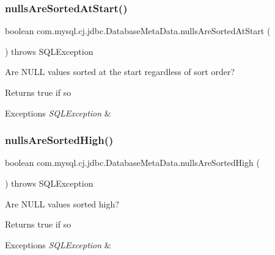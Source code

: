 \subsubsection{\texorpdfstring{nulls\+Are\+Sorted\+At\+Start()}{nullsAreSortedAtStart()}}
{\footnotesize\ttfamily boolean com.\+mysql.\+cj.\+jdbc.\+Database\+Meta\+Data.\+nulls\+Are\+Sorted\+At\+Start (\begin{DoxyParamCaption}{ }\end{DoxyParamCaption}) throws S\+Q\+L\+Exception}

Are N\+U\+LL values sorted at the start regardless of sort order?

\begin{DoxyReturn}{Returns}
true if so 
\end{DoxyReturn}

\begin{DoxyExceptions}{Exceptions}
{\em S\+Q\+L\+Exception} & \\
\hline
\end{DoxyExceptions}
\mbox{\label{classcom_1_1mysql_1_1cj_1_1jdbc_1_1_database_meta_data_ad87c8711db15505c80c215af9cf5107e}} 
\subsubsection{\texorpdfstring{nulls\+Are\+Sorted\+High()}{nullsAreSortedHigh()}}
{\footnotesize\ttfamily boolean com.\+mysql.\+cj.\+jdbc.\+Database\+Meta\+Data.\+nulls\+Are\+Sorted\+High (\begin{DoxyParamCaption}{ }\end{DoxyParamCaption}) throws S\+Q\+L\+Exception}

Are N\+U\+LL values sorted high?

\begin{DoxyReturn}{Returns}
true if so 
\end{DoxyReturn}

\begin{DoxyExceptions}{Exceptions}
{\em S\+Q\+L\+Exception} & \\
\hline
\end{DoxyExceptions}
\mbox{\label{classcom_1_1mysql_1_1cj_1_1jdbc_1_1_database_meta_data_ac35f97e98a243859aba5bb5c60aee7fa}} 
